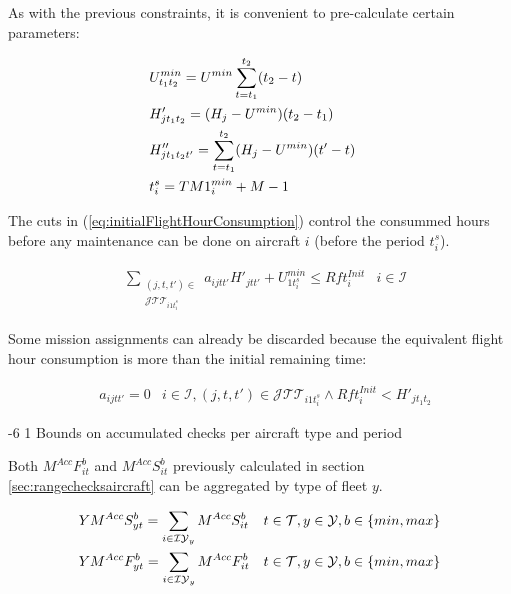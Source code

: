 \documentclass[a4paper,onecolumn,fleqn]{article}
\makeatletter
\renewcommand\section{\@startsection{section}{1}{\z@}%
                       {-6\p@ \@plus -0\p@ \@minus -0\p@}%
                       {2\p@ \@plus 0\p@ \@minus 0\p@}%
                       {\normalsize\textbf}}
\renewcommand\section{\@startsection{section}{2}{\z@}%
                       {-6\p@ \@plus -0\p@ \@minus -0\p@}%
                       {2\p@ \@plus 0\p@ \@minus 0\p@}%
                       {\normalsize\textbf}}
\renewcommand\section{\@startsection{section}{3}{\z@}%
                       {-6\p@ \@plus -0\p@ \@minus -0\p@}%
                       {1\p@ \@plus 0\p@ \@minus 0\p@}%
                       {\normalsize\itshape\bfseries}}
\makeatother
\begin{document}
  As with the previous constraints, it is convenient to pre-calculate certain parameters:

  \begin{align}
      & U^{min}_{t_1t_2} = U^{min} \sum_{t=t_1}^{t_2} (t_2 - t) \notag \\
      & H'_{jt_1t_2} = (H_j - U^{min}) (t_2 - t_1) \notag \\
      & H''_{jt_1t_2t'} = \sum_{t=t_1}^{t_2} (H_j- U^{min}) (t' - t) \notag \\
      & t^{s}_i = TM1^{min}_i + M - 1&  \notag
  \end{align}

  The cuts in (\ref{eq:initialFlightHourConsumption}) control the consummed hours before any maintenance can be done on aircraft $i$ (before the period $t^{s}_i$).

  \begin{align}
    & \sum_{\substack{(j, t, t') \in \\ \mathcal{J}\mathcal{T}\mathcal{T}_{i1t^{s}_i}}} a_{ijtt'} H'_{jtt'} + U^{min}_{1t^{s}_i} \leq Rft^{Init}_i
                    & i \in \mathcal{I} \label{eq:initialFlightHourConsumption}
  \end{align}

  Some mission assignments can already be discarded because the equivalent flight hour consumption is more than the initial remaining time:

  \begin{align}
    & a_{ijtt'} = 0 & i \in \mathcal{I}, (j, t, t') \in \mathcal{J}\mathcal{T}\mathcal{T}_{i1t^{s}_i} \land Rft^{Init}_i < H'_{jt_1t_2}
  \end{align}

\section{Bounds on accumulated checks per aircraft type and period} \label{sec:rangecheckstype}
  
  Both $M^{Acc}F^{b}_{it}$ and $M^{Acc}S^{b}_{it}$ previously calculated in section \ref{sec:rangechecksaircraft} can be aggregated by type of fleet $y$.

  \begin{align}
    & YM^{Acc}S^{b}_{yt} = \sum_{i \in \mathcal{IY}_y} M^{Acc}S^{b}_{it} 
        & t \in \mathcal{T}, y \in \mathcal{Y}, b \in \{min, max\} \notag \\
    & YM^{Acc}F^{b}_{yt} = \sum_{i \in \mathcal{IY}_y} M^{Acc}F^{b}_{it} 
        & t \in \mathcal{T}, y \in \mathcal{Y}, b \in \{min, max\} \notag
  \end{align}
\end{document}
